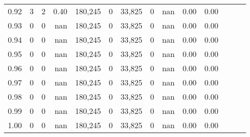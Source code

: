 \begin{tabular}{rrrrrrrrrrrrrr}
0.92 &      3 &    2 &  0.40 &  180,245 &        0 &  33,825 &       0 &   nan &  0.00 &      0.00 \\
0.93 &      0 &    0 &   nan &  180,245 &        0 &  33,825 &       0 &   nan &  0.00 &      0.00 \\
0.94 &      0 &    0 &   nan &  180,245 &        0 &  33,825 &       0 &   nan &  0.00 &      0.00 \\
0.95 &      0 &    0 &   nan &  180,245 &        0 &  33,825 &       0 &   nan &  0.00 &      0.00 \\
0.96 &      0 &    0 &   nan &  180,245 &        0 &  33,825 &       0 &   nan &  0.00 &      0.00 \\
0.97 &      0 &    0 &   nan &  180,245 &        0 &  33,825 &       0 &   nan &  0.00 &      0.00 \\
0.98 &      0 &    0 &   nan &  180,245 &        0 &  33,825 &       0 &   nan &  0.00 &      0.00 \\
0.99 &      0 &    0 &   nan &  180,245 &        0 &  33,825 &       0 &   nan &  0.00 &      0.00 \\
1.00 &      0 &    0 &   nan &  180,245 &        0 &  33,825 &       0 &   nan &  0.00 &      0.00 \\
\bottomrule
\end{tabular}
